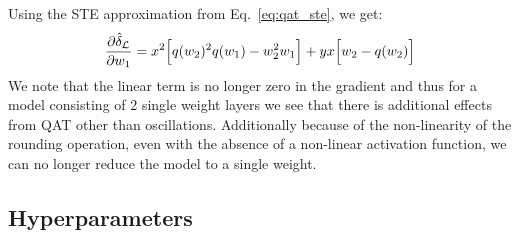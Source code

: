 Using the STE approximation from Eq.~\ref{eq:qat_ste}, we get:
\begin{equation}
\frac{\partial \Hat{\delta}_{\mathcal{L}}}{\partial w_1}
   =
   x^2 \Bigl[
      q(w_2)^2 q(w_1)
      - w_2^2 w_1
   \Bigr]
   + yx \Bigl[
      w_2 - q(w_2)
   \Bigr]
\end{equation}
We note that the linear term is no longer zero in the gradient and thus for a model consisting of 2 single weight layers we see that there is additional effects from QAT other than oscillations. Additionally because of the non-linearity of the rounding operation, even with the absence of a non-linear activation function, we can no longer reduce the model to a single weight.
\subsection{Hyperparameters}
\label{appendix:hyperparameters}
